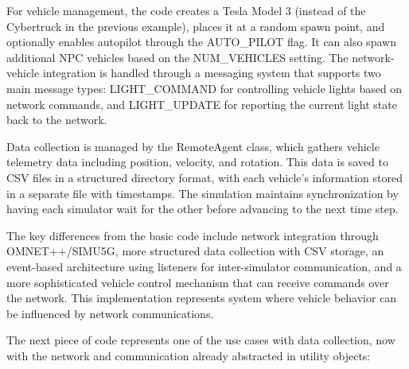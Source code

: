 For vehicle management, the code creates a Tesla Model 3 (instead of the Cybertruck in the previous example), places it at a random spawn point, and optionally enables autopilot through the AUTO\_PILOT flag. It can also spawn additional NPC vehicles based on the NUM\_VEHICLES setting. The network-vehicle integration is handled through a messaging system that supports two main message types: LIGHT\_COMMAND for controlling vehicle lights based on network commands, and LIGHT\_UPDATE for reporting the current light state back to the network.

Data collection is managed by the RemoteAgent class, which gathers vehicle telemetry data including position, velocity, and rotation. This data is saved to CSV files in a structured directory format, with each vehicle's information stored in a separate file with timestamps. The simulation maintains synchronization by having each simulator wait for the other before advancing to the next time step.

The key differences from the basic code include network integration through OMNET++/SIMU5G, more structured data collection with CSV storage, an event-based architecture using listeners for inter-simulator communication, and a more sophisticated vehicle control mechanism that can receive commands over the network. This implementation represents system where vehicle behavior can be influenced by network communications.

The next piece of code represents one of the use cases with data collection, now with the network and communication already abstracted in utility objects:

